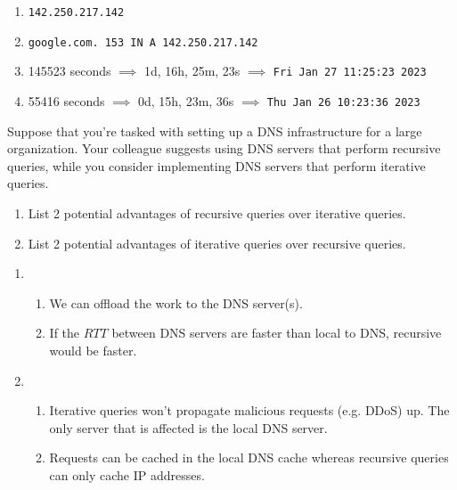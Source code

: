 \documentclass{report}
\begin{document}
\begin{problem}
\begin{enumerate}
\end{enumerate}


\begin{answer}{50em}
  \begin{enumerate}[label=(\alph*)]
  \item \texttt{142.250.217.142}
  \item \texttt{google.com.		153	IN	A	142.250.217.142}
  \item 145523 seconds $\implies$ 1d, 16h, 25m, 23s $\implies$ \texttt{Fri Jan 27 11:25:23 2023}
  \item 55416 seconds $\implies$ 0d, 15h, 23m, 36s $\implies$ \texttt{Thu Jan 26 10:23:36 2023}
  \end{enumerate}

\end{answer}

\end{problem}


\newpage

\newpage

\begin{problem}
Suppose that you're tasked with setting up a DNS infrastructure for a large organization. Your colleague suggests using DNS servers that perform recursive queries, while you consider implementing DNS servers that perform iterative queries.
\begin{enumerate}
\item List 2 potential advantages of recursive queries over iterative queries.
\item List 2 potential advantages of iterative queries over recursive queries.

\end{enumerate}


\begin{answer}{40em}
  \begin{enumerate}[label=(\alph*)]
    \item
    \begin{enumerate}[label=\textit{(\roman*)}]
    \item We can offload the work to the DNS server(s).
    \item If the $RTT$ between DNS servers are faster than local to DNS, recursive would be faster.
    \end{enumerate}

    \item
    \begin{enumerate}[label=\textit{(\roman*)}]
    \item Iterative queries won't propagate malicious requests (e.g. DDoS) up. The only server that
      is affected is the local DNS server.
    \item Requests can be cached in the local DNS cache whereas recursive queries can only cache IP
      addresses.
    \end{enumerate}
  \end{enumerate}


\end{answer}
\end{problem}
\end{document}
